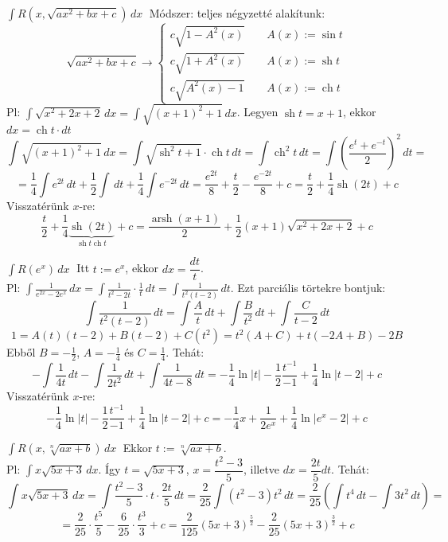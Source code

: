\documentclass[a4paper,12pt,twoside]{book}
\DeclareMathOperator{\sh}{sh} %
\DeclareMathOperator{\ch}{ch} %
\DeclareMathOperator{\arsh}{arsh}
\theoremstyle{break}
\theoremstyle{plain}
\newcommand{\integ}[1]{\ensuremath{\int #1\, dx}}
\newcommand{\integDT}[1]{\ensuremath{\int #1\, dt}}
\begin{document}
\begin{list}{.}{\leftmargin=1.5em}
 \item $\boxed{\integ{R\left(x, \sqrt{ax^2+bx+c}\right)}}\;$ Módszer: teljes négyzetté alakítunk:
  \[\sqrt{ax^2+bx+c} \rightarrow \begin{cases}
    c\sqrt{1-A^2(x)} \qquad A(x) := \sin t\\
    c\sqrt{1+A^2(x)} \qquad A(x) := \sh t\\
    c\sqrt{A^2(x)-1} \qquad A(x) := \ch t
  \end{cases}\]
  Pl: $\displaystyle \integ{\sqrt{x^2+2x+2}} = \integ{\sqrt{(x+1)^2+1}}$. Legyen $\sh t = x+1$, ekkor $dx = \ch t\cdot dt$
  \[\integ{\sqrt{(x+1)^2+1}} = \integDT{\sqrt{\sh^2 t + 1}\cdot\ch t} = \integDT{\ch^2 t} = \integDT{\left(\frac{e^t+e^{-t}}{2}\right)^2} = \]
  \[= \frac{1}{4}\integDT{ e^{2t} }+\frac{1}{2}\integDT{} +\frac{1}{4}\integDT{ e^{-2t} } =  \frac{e^{2t}}{8}+\frac{t}{2}-\frac{e^{-2t}}{8}+c = \frac{t}{2}+\frac{1}{4}\sh(2t) + c  \]
  Visszatérünk $x$-re:
  \[\frac{t}{2}+\frac{1}{4}\underbrace{\sh(2t)}_{\sh t\ch t} + c = \frac{\arsh(x+1)}{2}+\frac{1}{2}(x+1)\sqrt{x^2+2x+2}+c\]

 \item $\boxed{\integ{R(e^x)}}\;$
  Itt $t := e^x$, ekkor $dx = \dfrac{dt}{t}$.\\
  Pl: $\displaystyle \integ{\frac{1}{e^{2x}-2e^x}} = \integDT{\frac{1}{t^2-2t}\cdot \frac{1}{t}} = \integDT{\frac{1}{t^2(t-2)}}$.
  Ezt parciális törtekre bontjuk:
  \[\integDT{\frac{1}{t^2(t-2)}} = \integDT{\frac{A}{t}}+\integDT{\frac{B}{t^2}}+\integDT{\frac{C}{t-2}}\]
  \[1 = A(t)(t-2)+B(t-2)+C(t^2) = t^2(A+C)+t(-2A+B)-2B\]
  Ebből $B=-\frac{1}{2}$, $A=-\frac{1}{4}$ és $C=\frac{1}{4}$. Tehát:
  \[-\integDT{\frac{1}{4t}}-\integDT{\frac{1}{2t^2}}+\integDT{\frac{1}{4t-8}} = -\frac{1}{4}\ln|t|-\frac{1}{2}\frac{t^{-1}}{-1}+\frac{1}{4}\ln|t-2|+c\]
  Visszatérünk $x$-re:
  \[-\frac{1}{4}\ln|t|-\frac{1}{2}\frac{t^{-1}}{-1}+\frac{1}{4}\ln|t-2|+c = -\frac{1}{4}x+\frac{1}{2e^x}+\frac{1}{4}\ln|e^x-2|+c\]

 \item $\boxed{\integ{R\left(x, \sqrt[n]{ax+b}\right)}}\;$ Ekkor $t := \sqrt[n]{ax+b}$.\\
  Pl: $\displaystyle \integ{x\sqrt{5x+3}}$. Így $t = \sqrt{5x+3}$, $x = \dfrac{t^2-3}{5}$, illetve $dx=\dfrac{2t}{5}dt$. Tehát:
  \[\integ{x\sqrt{5x+3}} = \integDT{\frac{t^2-3}{5}\cdot t\cdot\dfrac{2t}{5}} = \frac{2}{25}\integDT{(t^2-3)t^2} = \frac{2}{25}\left(\integDT{t^4}-\integDT{3t^2}\right) =\]
  \[= \frac{2}{25}\cdot\frac{t^5}{5}-\frac{6}{25}\cdot\frac{t^3}{3}+c = \frac{2}{125}(5x+3)^{\frac{5}{2}}-\frac{2}{25}(5x+3)^{\frac{3}{2}}+c\]


\end{list}
\end{document}

